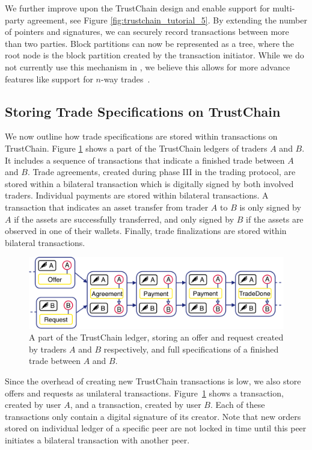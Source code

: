 We further improve upon the TrustChain design and enable support for multi-party agreement, see Figure \ref{fig:trustchain_tutorial_5}.
By extending the number of pointers and signatures, we can securely record transactions between more than two parties.
Block partitions can now be represented as a tree, where the root node is the block partition created by the transaction initiator.
While we do not currently use this mechanism in \ModelName{}, we believe this allows for more advance features like support for $n$-way trades~\cite{wang2018loopring}.

\subsection{Storing Trade Specifications on TrustChain}
We now outline how trade specifications are stored within transactions on TrustChain.
Figure \ref{fig:trustchain_market} shows a part of the TrustChain ledgers of traders $ A $ and $ B $.
It includes a sequence of transactions that indicate a finished trade between $ A $ and $ B $.
Trade agreements, created during phase III in the \ModelName{} trading protocol, are stored within a bilateral \TRAgreement{} transaction which is digitally signed by both involved traders.
Individual payments are stored within bilateral \TRPayment{} transactions.
A \TRPayment{} transaction that indicates an asset transfer from trader $ A $ to $ B $ is only signed by $ A $ if the assets are successfully transferred, and only signed by $ B $ if the assets are observed in one of their wallets.
Finally, trade finalizations are stored within bilateral \TRTradeDone{} transactions.

\begin{figure}[t]
	\centering
	\includegraphics[width=.8\linewidth]{xchange/assets/trustchain_market}
	\caption{A part of the TrustChain ledger, storing an offer and request created by traders $ A $ and $ B $ respectively, and full specifications of a finished trade between $ A $ and $ B $.}
	\label{fig:trustchain_market}
\end{figure}

Since the overhead of creating new TrustChain transactions is low, we also store offers and requests as unilateral transactions.
Figure~\ref{fig:trustchain_market} shows a \TROffer{} transaction, created by user $ A $, and a \TRRequest{} transaction, created by user $ B $.
Each of these transactions only contain a digital signature of its creator.
Note that new orders stored on individual ledger of a specific peer are not locked in time until this peer initiates a bilateral transaction with another peer.



